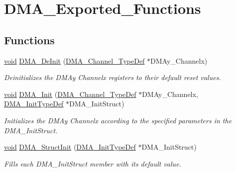 \hypertarget{group___d_m_a___exported___functions}{}\section{D\+M\+A\+\_\+\+Exported\+\_\+\+Functions}
\label{group___d_m_a___exported___functions}
\subsection*{Functions}
\begin{DoxyCompactItemize}
\item 
\hyperlink{usb__devapi_8h_afabf60e7f57651d6d595a02c75f07cd0}{void} \hyperlink{group___d_m_a___exported___functions_ga21ca0d50b13e502db5ab5feb484f9ece}{D\+M\+A\+\_\+\+De\+Init} (\hyperlink{struct_d_m_a___channel___type_def}{D\+M\+A\+\_\+\+Channel\+\_\+\+Type\+Def} $\ast$D\+M\+Ay\+\_\+\+Channelx)
\begin{DoxyCompactList}\small\item\em Deinitializes the D\+M\+Ay Channelx registers to their default reset values. \end{DoxyCompactList}\item 
\hyperlink{usb__devapi_8h_afabf60e7f57651d6d595a02c75f07cd0}{void} \hyperlink{group___d_m_a___exported___functions_ga7c3d1b9dc041f8e5f2cfc8d5dd858278}{D\+M\+A\+\_\+\+Init} (\hyperlink{struct_d_m_a___channel___type_def}{D\+M\+A\+\_\+\+Channel\+\_\+\+Type\+Def} $\ast$D\+M\+Ay\+\_\+\+Channelx, \hyperlink{struct_d_m_a___init_type_def}{D\+M\+A\+\_\+\+Init\+Type\+Def} $\ast$D\+M\+A\+\_\+\+Init\+Struct)
\begin{DoxyCompactList}\small\item\em Initializes the D\+M\+Ay Channelx according to the specified parameters in the D\+M\+A\+\_\+\+Init\+Struct. \end{DoxyCompactList}\item 
\hyperlink{usb__devapi_8h_afabf60e7f57651d6d595a02c75f07cd0}{void} \hyperlink{group___d_m_a___exported___functions_ga0f7f95f750a90a6824f4e9b6f58adc7e}{D\+M\+A\+\_\+\+Struct\+Init} (\hyperlink{struct_d_m_a___init_type_def}{D\+M\+A\+\_\+\+Init\+Type\+Def} $\ast$D\+M\+A\+\_\+\+Init\+Struct)
\begin{DoxyCompactList}\small\item\em Fills each D\+M\+A\+\_\+\+Init\+Struct member with its default value. \end{DoxyCompactList}\item 

\end{DoxyCompactItemize}
